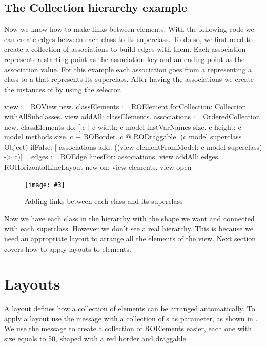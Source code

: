 \documentclass[a4paper,10pt,twoside]{book}
\newcommand{\fig}[4]{
		\begin{figure}[#1]
			\centering
			\texttt{[image: \#3]}
			\caption{\label{fig:#3}#4}
		\end{figure}}
\begin{document}
\subsection*{The Collection hierarchy example}
Now we know how to make links between elements. With the following code we can create edges between each class to its superclass. To do so, we first need to create a collection of associations to build edges with them. Each association represents a starting point as the association key and an ending point as the association value. For this example each association goes from a  representing a class to a  that represents its superclass. After having the associations we create the instances of  by using the  selector.


\begin{code}{}
view := ROView new.
classElements := ROElement forCollection: Collection withAllSubclasses.
view addAll: classElements.
associations := OrderedCollection new.
classElements do: [:c | 
	c width: c model instVarNames size.
	c height: c model methods size.
	c + ROBorder. 
	c @ RODraggable.	
	(c model superclass = Object)
		ifFalse: [ associations add: ((view elementFromModel: c model superclass) -> c)]	
	 ].
edges := ROEdge linesFor: associations.
view addAll: edges.
ROHorizontalLineLayout new on: view elements.
view open
\end{code}

\fig{H}{0.6}{hier3}{Adding links between each class and its superclass}

Now we have each class in the  hierarchy with the shape we want and connected with each superclass. However we don't see a real hierarchy. This is because we need an appropriate layout to arrange all the elements of the view. Next section covers how to apply layouts to elements.


\section{Layouts} 
A layout defines how a collection of elements can be arranged automatically. To apply a layout use the  message with a collection of s as parameter, as shown in . We use the  message to create a collection of ROElements easier, each one with size equals to 50, shaped with a red border and draggable.
\end{document}
